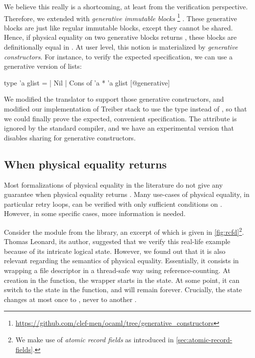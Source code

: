 \label{subsec:generative-constructors}
We believe this really is a shortcoming, at least from the verification perspective.
Therefore, we extended \OCaml with \emph{generative immutable blocks}%
\footnote{
\url{https://github.com/clef-men/ocaml/tree/generative_constructors}
}%
.
These generative blocks are just like regular immutable blocks, except they cannot be shared.
Hence, if physical equality on two generative blocks returns , these blocks are definitionally equal in \Rocq.
At user level, this notion is materialized by \emph{generative constructors}.
For instance, to verify the expected  specification, we can use a generative version of lists:
\begin{ocamlcode}
type 'a glist =
  | Nil
  | Cons of 'a * 'a glist [@generative]
\end{ocamlcode}

We modified the \Zoo translator to support those generative constructors, and modified our implementation of Treiber stack to use the type  instead of , so that we could finally prove the expected, convenient specification.
The \ocamlinline{[@generative]} attribute is ignored by the standard \OCaml compiler, and we have an experimental version that disables sharing for generative constructors.

\subsection{When physical equality returns }



Most formalizations of physical equality in the literature do not give any guarantee when physical equality returns .
Many use-cases of physical equality, in particular retry loops, can be verified with only sufficient conditions on .
However, in some specific cases, more information is needed.

Consider the  module from the \Eio library, an excerpt of which is given in \cref{fig:rcfd}\footnote{We make use of \emph{atomic record fields} as introduced in \cref{sec:atomic-record-fields}.}.
Thomas Leonard, its author, suggested that we verify this real-life example because of its intricate logical state.
However, we found out that it is also relevant regarding the semantics of physical equality.
Essentially, it consists in wrapping a file descriptor in a thread-safe way using reference-counting.
At creation in the  function, the wrapper starts in the  state.
At some point, it can switch to the  state in the  function, and will remain  forever.
Crucially, the  state changes at most once to , never to another .

